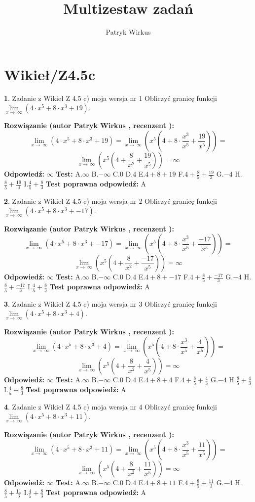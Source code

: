 \documentclass[12pt, a4paper]{article}
\title{Multizestaw zadań}
\author{Patryk Wirkus}
\date{}
\theoremstyle{definition} %
\newtheorem{zad}{}
\newcommand{\kategoria}[1]{\section{#1}}
\newcommand{\zadStart}[1]{\begin{zad}#1\newline}
\newcommand{\zadStop}{\end{zad}}
\newcommand{\rozwStart}[2]{\noindent \textbf{Rozwiązanie (autor #1 , recenzent #2): }\newline}
\newcommand{\rozwStop}{\newline}
\newcommand{\odpStart}{\noindent \textbf{Odpowiedź:}\newline}
\newcommand{\odpStop}{\newline}
\newcommand{\testStart}{\noindent \textbf{Test:}\newline}
\newcommand{\testStop}{\newline}
\newcommand{\kluczStart}{\noindent \textbf{Test poprawna odpowiedź:}\newline}
\newcommand{\kluczStop}{\newline}
\begin{document}
\maketitle

\kategoria{Wikieł/Z4.5c}


\zadStart{Zadanie z Wikieł Z 4.5 c) moja wersja nr 1}
Obliczyć granicę funkcji  $\lim\limits_{x\to\ \infty}(4 \cdot x^{5}+8 \cdot x^{3}+19)$.
\zadStop
\rozwStart{Patryk Wirkus}{}
$$\lim\limits_{x\to\ \infty}(4 \cdot x^{5}+8 \cdot x^{3}+19) = \lim\limits_{x\to\ \infty}(x^{5}(4 +8 \cdot \frac{x^{3}}{x^{5}}+\frac{19}{x^{5}})) =$$ $$\lim\limits_{x\to\ \infty}(x^{5}(4 +\frac{8}{x^{2}}+\frac{19}{x^{5}})) =\infty$$
\rozwStop
\odpStart
$\infty$
\odpStop
\testStart
A.$\infty$ B.$-\infty$ C.$0$ D.$4$ E.$4 + 8 + 19$
F.$4+\frac{8}{5}+\frac{19}{3}$ G.$-4$
H.$\frac{8}{5}+\frac{19}{3}$
I.$\frac{4}{5}+\frac{8}{3}$
\testStop
\kluczStart
A
\kluczStop



\zadStart{Zadanie z Wikieł Z 4.5 c) moja wersja nr 2}
Obliczyć granicę funkcji  $\lim\limits_{x\to\ \infty}(4 \cdot x^{5}+8 \cdot x^{3}+-17)$.
\zadStop
\rozwStart{Patryk Wirkus}{}
$$\lim\limits_{x\to\ \infty}(4 \cdot x^{5}+8 \cdot x^{3}+-17) = \lim\limits_{x\to\ \infty}(x^{5}(4 +8 \cdot \frac{x^{3}}{x^{5}}+\frac{-17}{x^{5}})) =$$ $$\lim\limits_{x\to\ \infty}(x^{5}(4 +\frac{8}{x^{2}}+\frac{-17}{x^{5}})) =\infty$$
\rozwStop
\odpStart
$\infty$
\odpStop
\testStart
A.$\infty$ B.$-\infty$ C.$0$ D.$4$ E.$4 + 8 + -17$
F.$4+\frac{8}{5}+\frac{-17}{3}$ G.$-4$
H.$\frac{8}{5}+\frac{-17}{3}$
I.$\frac{4}{5}+\frac{8}{3}$
\testStop
\kluczStart
A
\kluczStop



\zadStart{Zadanie z Wikieł Z 4.5 c) moja wersja nr 3}
Obliczyć granicę funkcji  $\lim\limits_{x\to\ \infty}(4 \cdot x^{5}+8 \cdot x^{3}+4)$.
\zadStop
\rozwStart{Patryk Wirkus}{}
$$\lim\limits_{x\to\ \infty}(4 \cdot x^{5}+8 \cdot x^{3}+4) = \lim\limits_{x\to\ \infty}(x^{5}(4 +8 \cdot \frac{x^{3}}{x^{5}}+\frac{4}{x^{5}})) =$$ $$\lim\limits_{x\to\ \infty}(x^{5}(4 +\frac{8}{x^{2}}+\frac{4}{x^{5}})) =\infty$$
\rozwStop
\odpStart
$\infty$
\odpStop
\testStart
A.$\infty$ B.$-\infty$ C.$0$ D.$4$ E.$4 + 8 + 4$
F.$4+\frac{8}{5}+\frac{4}{3}$ G.$-4$
H.$\frac{8}{5}+\frac{4}{3}$
I.$\frac{4}{5}+\frac{8}{3}$
\testStop
\kluczStart
A
\kluczStop



\zadStart{Zadanie z Wikieł Z 4.5 c) moja wersja nr 4}
Obliczyć granicę funkcji  $\lim\limits_{x\to\ \infty}(4 \cdot x^{5}+8 \cdot x^{3}+11)$.
\zadStop
\rozwStart{Patryk Wirkus}{}
$$\lim\limits_{x\to\ \infty}(4 \cdot x^{5}+8 \cdot x^{3}+11) = \lim\limits_{x\to\ \infty}(x^{5}(4 +8 \cdot \frac{x^{3}}{x^{5}}+\frac{11}{x^{5}})) =$$ $$\lim\limits_{x\to\ \infty}(x^{5}(4 +\frac{8}{x^{2}}+\frac{11}{x^{5}})) =\infty$$
\rozwStop
\odpStart
$\infty$
\odpStop
\testStart
A.$\infty$ B.$-\infty$ C.$0$ D.$4$ E.$4 + 8 + 11$
F.$4+\frac{8}{5}+\frac{11}{3}$ G.$-4$
H.$\frac{8}{5}+\frac{11}{3}$
I.$\frac{4}{5}+\frac{8}{3}$
\testStop
\kluczStart
A
\kluczStop
\end{document}
